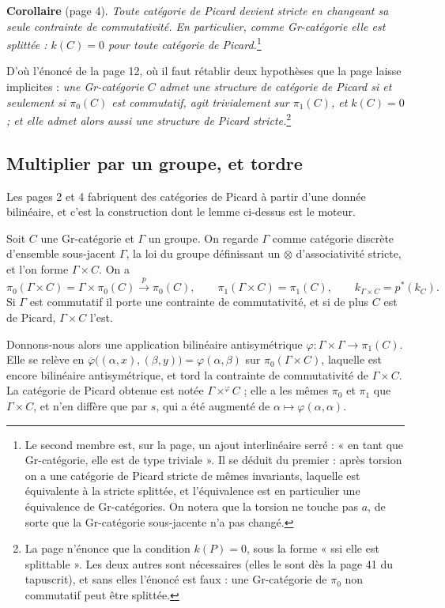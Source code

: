 \documentclass[11pt,a4paper]{article}
\begin{document}
\textbf{Corollaire} (page 4). \emph{Toute catégorie de Picard devient stricte
en changeant sa seule contrainte de commutativité. En particulier, comme
Gr-catégorie elle est splittée : $k(C) = 0$ pour toute catégorie de
Picard.}\footnote{Le second membre est, sur la page, un ajout interlinéaire
serré : « en tant que Gr-catégorie, elle est de type triviale ». Il se déduit
du premier : après torsion on a une catégorie de Picard stricte de mêmes
invariants, laquelle est équivalente à la stricte splittée, et l'équivalence
est en particulier une équivalence de Gr-catégories. On notera que la torsion
ne touche pas $a$, de sorte que la Gr-catégorie sous-jacente n'a pas changé.}

D'où l'énoncé de la page 12, où il faut rétablir deux hypothèses que la page
laisse implicites : \emph{une Gr-catégorie $C$ admet une structure de
catégorie de Picard si et seulement si $\pi_{0}(C)$ est commutatif, agit
trivialement sur $\pi_{1}(C)$, et $k(C) = 0$ ; et elle admet alors aussi une
structure de Picard stricte.}\footnote{La page n'énonce que la condition
$k(P) = 0$, sous la forme « ssi elle est splittable ». Les deux autres sont
nécessaires (elles le sont dès la page 41 du tapuscrit), et sans elles
l'énoncé est faux : une Gr-catégorie de $\pi_{0}$ non commutatif peut être
splittée.}

\subsection*{Multiplier par un groupe, et tordre}

Les pages 2 et 4 fabriquent des catégories de Picard à partir d'une donnée
bilinéaire, et c'est la construction dont le lemme ci-dessus est le moteur.

Soit $C$ une Gr-catégorie et $\Gamma$ un groupe. On regarde $\Gamma$ comme
catégorie discrète d'ensemble sous-jacent $\Gamma$, la loi du groupe
définissant un $\otimes$ d'associativité stricte, et l'on forme $\Gamma \times
C$. On a
\[
\pi_{0}(\Gamma \times C) = \Gamma \times \pi_{0}(C)
\xrightarrow{\ p\ } \pi_{0}(C), \qquad
\pi_{1}(\Gamma \times C) = \pi_{1}(C), \qquad
k_{\Gamma \times C} = p^{*}(k_{C}).
\]
Si $\Gamma$ est commutatif il porte une contrainte de commutativité, et si de
plus $C$ est de Picard, $\Gamma \times C$ l'est.

Donnons-nous alors une application bilinéaire antisymétrique $\varphi : \Gamma
\times \Gamma \to \pi_{1}(C)$. Elle se relève en
$\overline{\varphi}\bigl((\alpha,x),(\beta,y)\bigr) = \varphi(\alpha,\beta)$
sur $\pi_{0}(\Gamma \times C)$, laquelle est encore bilinéaire
antisymétrique, et tord la contrainte de commutativité de $\Gamma \times C$.
La catégorie de Picard obtenue est notée $\Gamma \times^{\varphi} C$ ; elle a
les mêmes $\pi_{0}$ et $\pi_{1}$ que $\Gamma \times C$, et n'en diffère que par $s$, qui a été augmenté de $\alpha \mapsto
\varphi(\alpha,\alpha)$.
\end{document}

